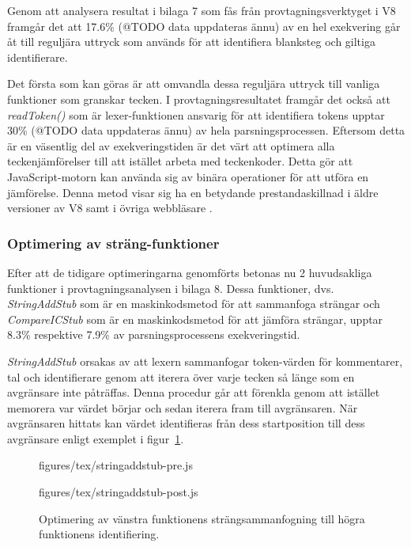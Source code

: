 Genom att analysera resultat i bilaga 7 som fås från provtagningsverktyget i
V8 framgår det att 17.6\% (@TODO data uppdateras ännu) av en hel exekvering
går åt till reguljära uttryck som används för att identifiera blanksteg och
giltiga identifierare.

Det första som kan göras är att omvandla dessa reguljära uttryck till vanliga
funktioner som granskar tecken. I provtagningsresultatet framgår det också att
\textit{readToken()} som är lexer-funktionen ansvarig för att identifiera
tokens upptar 30\% (@TODO data uppdateras ännu)  av hela parsningsprocessen.
Eftersom detta är en väsentlig del av exekveringstiden är det värt att
optimera alla teckenjämförelser till att istället arbeta med teckenkoder.
Detta gör att JavaScript-motorn kan använda sig av binära operationer för att
utföra en jämförelse. Denna metod visar sig ha en betydande prestandaskillnad
i äldre versioner av V8 samt i övriga webbläsare \citep{charcodeat}.

\subsubsection{Optimering av sträng-funktioner}

Efter att de tidigare optimeringarna genomförts betonas nu 2 huvudsakliga
funktioner i provtagningsanalysen i bilaga 8. Dessa funktioner, dvs.
\textit{StringAddStub} som är en maskinkodsmetod för att sammanfoga strängar
och \textit{CompareICStub} som är en maskinkodsmetod för att jämföra strängar,
upptar 8.3\% respektive 7.9\% av parsningsprocessens exekveringstid.

\textit{StringAddStub} orsakas av att lexern sammanfogar token-värden för
kommentarer, tal och identifierare genom att iterera över varje tecken så
länge som en avgränsare inte påträffas. Denna procedur går att förenkla genom
att istället memorera var värdet börjar och sedan iterera fram till
avgränsaren. När avgränsaren hittats kan värdet identifieras från dess
startposition till dess avgränsare enligt exemplet i figur~\ref{fig:stringAddStub}.

\begin{figure}[ht]
  \begin{minipage}[t]{0.5\textwidth}
      {figures/tex/stringaddstub-pre.js}
  \end{minipage}%
  \begin{minipage}[t]{0.5\textwidth}
      {figures/tex/stringaddstub-post.js}
  \end{minipage}
  \caption{Optimering av vänstra funktionens strängsammanfogning till högra
    funktionens identifiering.}
  \label{fig:stringAddStub}
\end{figure}


